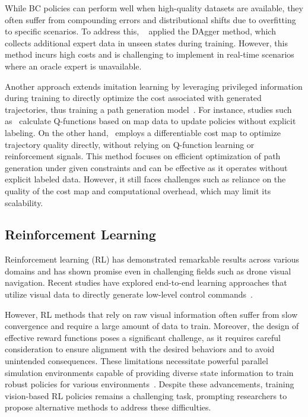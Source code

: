 While BC policies can perform well when high-quality datasets are available, they often suffer from compounding errors and distributional shifts due to overfitting to specific scenarios. To address this, ~\cite{loquercio2021learning} applied the DAgger method, which collects additional expert data in unseen states during training. However, this method incurs high costs and is challenging to implement in real-time scenarios where an oracle expert is unavailable.

Another approach extends imitation learning by leveraging privileged information during training to directly optimize the cost associated with generated trajectories, thus training a path generation model~\cite{lu2023lpnet, lu2024you, yang2023iplanner}. For instance, studies such as~\cite{lu2023lpnet, lu2024you} calculate Q-functions based on map data to update policies without explicit labeling. On the other hand,~\cite{yang2023iplanner} employs a differentiable cost map to optimize trajectory quality directly, without relying on Q-function learning or reinforcement signals. This method focuses on efficient optimization of path generation under given constraints and can be effective as it operates without explicit labeled data. However, it still faces challenges such as reliance on the quality of the cost map and computational overhead, which may limit its scalability.

\subsection{Reinforcement Learning}
Reinforcement learning (RL) has demonstrated remarkable results across various domains and has shown promise even in challenging fields such as drone visual navigation. Recent studies have explored end-to-end learning approaches that utilize visual data to directly generate low-level control commands~\cite{yu2024mavrl, bhattacharya2024vision, xing2024bootstrapping,  song2023learning, kulkarni2024reinforcement}.

However, RL methods that rely on raw visual information often suffer from slow convergence and require a large amount of data to train. Moreover, the design of effective reward functions poses a significant challenge, as it requires careful consideration to ensure alignment with the desired behaviors and to avoid unintended consequences. These limitations necessitate powerful parallel simulation environments capable of providing diverse state information to train robust policies for various environments~\cite{makoviychuk2isaac, song2021flightmare, kulkarni2023aerial}. Despite these advancements, training vision-based RL policies remains a challenging task, prompting researchers to propose alternative methods to address these difficulties.

